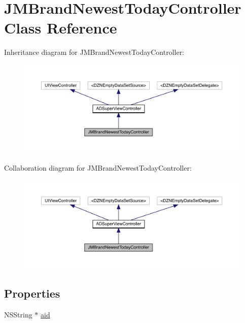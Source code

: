 \hypertarget{interface_j_m_brand_newest_today_controller}{}\section{J\+M\+Brand\+Newest\+Today\+Controller Class Reference}
\label{interface_j_m_brand_newest_today_controller}


Inheritance diagram for J\+M\+Brand\+Newest\+Today\+Controller\+:\nopagebreak
\begin{figure}[H]
\begin{center}
\leavevmode
\includegraphics[width=350pt]{interface_j_m_brand_newest_today_controller__inherit__graph}
\end{center}
\end{figure}


Collaboration diagram for J\+M\+Brand\+Newest\+Today\+Controller\+:\nopagebreak
\begin{figure}[H]
\begin{center}
\leavevmode
\includegraphics[width=350pt]{interface_j_m_brand_newest_today_controller__coll__graph}
\end{center}
\end{figure}
\subsection*{Properties}
\begin{DoxyCompactItemize}
\item 
N\+S\+String $\ast$ \mbox{\hyperlink{interface_j_m_brand_newest_today_controller_a017b3c9bffad7c090888301c693bad33}{aid}}
\end{DoxyCompactItemize}
